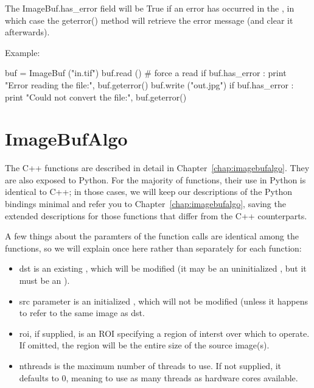 The {\cf ImageBuf.has_error} field will be {\cf True} if an error has
occurred in the \ImageBuf, in which case the {\cf geterror()} method will
retrieve the error message (and clear it afterwards).

\noindent Example:
\begin{code}
    buf = ImageBuf ("in.tif")
    buf.read ()   # force a read
    if buf.has_error :
        print "Error reading the file:", buf.geterror()
    buf.write ("out.jpg")
    if buf.has_error :
        print "Could not convert the file:", buf.geterror()
\end{code}
\apiend


\newpage
\section{ImageBufAlgo}
\label{sec:pythonimagebufalgo}

The C++ \IBA functions are described in detail in
Chapter~\ref{chap:imagebufalgo}.  They are also exposed to Python.
For the majority of \IBA functions, their use in Python is identical
to C++; in those cases, we will keep our descriptions of the Python
bindings minimal and refer you to Chapter~\ref{chap:imagebufalgo}, saving
the extended descriptions for those functions that differ from the C++
counterparts.

A few things about the paramters of the \IBA function calls are identical
among the functions, so we will explain once here rather than separately for
each function:

\begin{itemize}
\item {\cf dst} is an existing \ImageBuf, which will be modified (it may be
an uninitialized \ImageBuf, but it must be an \ImageBuf).
\item {\cf src} parameter is an initialized \ImageBuf, which will not be
modified (unless it happens to refer to the same image as {\cf dst}.
\item {\cf roi}, if supplied, is an {\cf ROI} specifying a region of interst
over which to operate. If omitted, the region will be the entire size of the
source image(s).
\item {\cf nthreads} is the maximum number of threads to use. If not
supplied, it defaults to 0, meaning to use as many threads as hardware cores
available.
\end{itemize}

